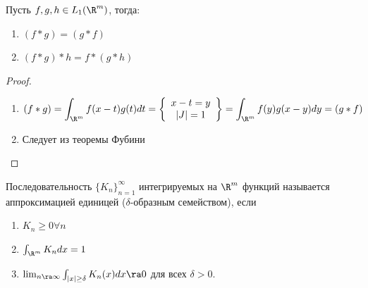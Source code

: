 \begin{proposition}
    Пусть \(f, g, h \in L_1(\R^m)\), тогда:
    \begin{enumerate}
        \item \((f * g) = (g * f)\)
        \item \((f * g) * h = f * (g * h)\)
    \end{enumerate}
\end{proposition}
\begin{proof}\indent
    \begin{enumerate}
        \item \[(f * g) = \int_{\R^m} f(x - t)g(t) dt = \left\{\begin{array}{c}
            x - t = y \\
            |J| = 1
        \end{array}\right\} = \int_{\R^m} f(y)g(x - y)dy = (g * f)\]
        \item Следует из теоремы Фубини
    \end{enumerate}
\end{proof}

\begin{definition}
    Последовательность \(\{K_n\}_{n = 1}^\infty\) интегрируемых на \(\R^m\) функций называется аппроксимацией единицей (\(\delta\)-образным семейством), если 
    \begin{enumerate}
        \item \(K_n \ge 0 \forall n\)
        \item \(\int_{\R^m} K_ndx = 1\)
        \item \(\lim_{n \ra \infty} \int_{|x| \ge \delta} K_n(x)dx \ra 0\) для всех \(\delta > 0\).
    \end{enumerate}
\end{definition}

